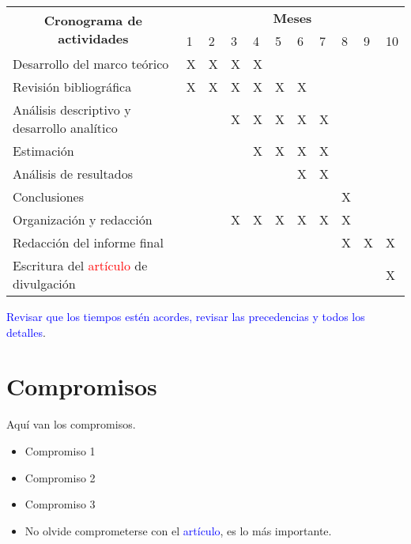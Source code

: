 \documentclass[12pt]{article}
\begin{document}
	\begin{center}
		\begin{tabular}{lllllllllll}
			\hline
			\multicolumn{1}{c}{\multirow{2}{*}{\textbf{Cronograma de actividades}}} & \multicolumn{10}{c}{\textbf{Meses}}  \\  
			\multicolumn{1}{c}{} & 1 & 2 & 3 & 4 & 5 & 6 & 7 & 8 & 9 & 10 \\ \hline
			Desarrollo del marco teórico & X & X & X & X & & & & & &  \\ 
			Revisión bibliográfica & X & X & X & X & X & X & & & &  \\ 
			Análisis descriptivo y desarrollo analítico & & & X & X & X & X & X & & &\\ 
			Estimación & & & & X & X & X & X & & &  \\ 
			Análisis de resultados & & & & & & X & X & & &  \\ 	
			Conclusiones & & & & & & & & X & &  \\ 
			Organización y redacción & & & X & X & X & X & X & X & &  \\ 
			Redacción del informe final & & & & & & & & X & X & X \\
			Escritura del \textcolor{red}{artículo} de divulgación & & & & & & & & & & X \\\hline
			
		\end{tabular}
	\end{center}

\textcolor{blue}{Revisar que los tiempos estén acordes, revisar las precedencias y todos los detalles}.

\section{Compromisos}
Aquí van los compromisos.

\begin{itemize}
	\item Compromiso 1
	\item Compromiso 2
	\item Compromiso 3
	\item No olvide comprometerse con el \textcolor{blue}{artículo}, es lo más importante.
\end{itemize}

\newpage
 
\end{document}
